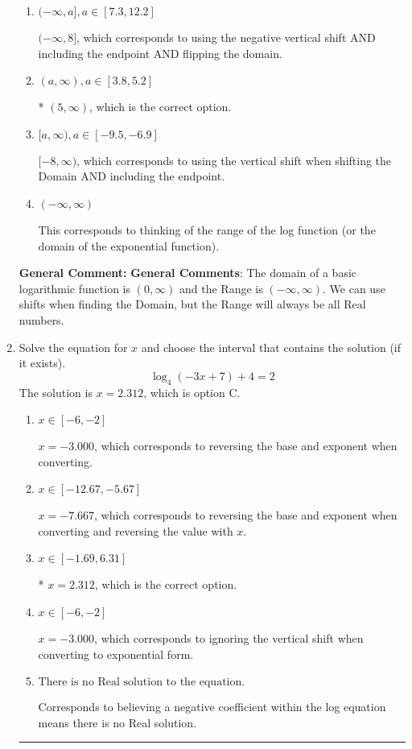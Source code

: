 \documentclass{extbook}[14pt]
\newcommand{\litem}[1]{\item #1

\rule{\textwidth}{0.4pt}}
\begin{document}
\begin{enumerate}
{\begin{enumerate}[label=\Alph*.]
$(-\infty, -5)$, which corresponds to flipping the Domain. Remember: the general for is $a*\log(x-h)+k$, \textbf{where $a$ does not affect the domain}.
\item \( (-\infty, a], a \in [7.3, 12.2] \)

$(-\infty, 8]$, which corresponds to using the negative vertical shift AND including the endpoint AND flipping the domain.
\item \( (a, \infty), a \in [3.8, 5.2] \)

* $(5, \infty)$, which is the correct option.
\item \( [a, \infty), a \in [-9.5, -6.9] \)

$[-8, \infty)$, which corresponds to using the vertical shift when shifting the Domain AND including the endpoint.
\item \( (-\infty, \infty) \)

This corresponds to thinking of the range of the log function (or the domain of the exponential function).
\end{enumerate}

\textbf{General Comment:} \textbf{General Comments}: The domain of a basic logarithmic function is $(0, \infty)$ and the Range is $(-\infty, \infty)$. We can use shifts when finding the Domain, but the Range will always be all Real numbers.
}
\litem{
Solve the equation for $x$ and choose the interval that contains the solution (if it exists).
\[ \log_{4}{(-3x+7)}+4 = 2 \]The solution is \( x = 2.312 \), which is option C.\begin{enumerate}[label=\Alph*.]
\item \( x \in [-6, -2] \)

$x = -3.000$, which corresponds to reversing the base and exponent when converting.
\item \( x \in [-12.67, -5.67] \)

$x = -7.667$, which corresponds to reversing the base and exponent when converting and reversing the value with $x$.
\item \( x \in [-1.69, 6.31] \)

* $x = 2.312$, which is the correct option.
\item \( x \in [-6, -2] \)

$x = -3.000$, which corresponds to ignoring the vertical shift when converting to exponential form.
\item \( \text{There is no Real solution to the equation.} \)

Corresponds to believing a negative coefficient within the log equation means there is no Real solution.
\end{enumerate}

}
\end{enumerate}
\end{document}
